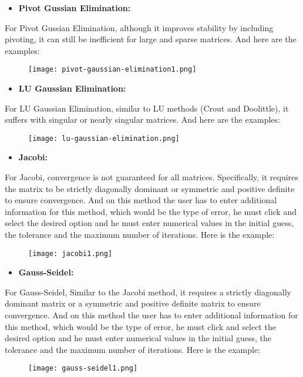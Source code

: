 \documentclass{uofa-eng-assignment}
\begin{document}
\begin{itemize}
    \item \textbf{Pivot Gussian Elimination:}
\end{itemize}
For Pivot Gussian Elimination, although it improves stability by including pivoting, it can still be inefficient for large and sparse matrices. And here are the examples:
\begin{figure}
    \centering
    \texttt{[image: pivot-gaussian-elimination1.png]}
\end{figure}
\begin{itemize}
    \item \textbf{LU Gaussian Elimination:}
\end{itemize}
For LU Gaussian Elimination, similar to LU methods (Crout and Doolittle), it suffers with singular or nearly singular matrices. And here are the examples:
\begin{figure}[H]
    \centering
    \texttt{[image: lu-gaussian-elimination.png]}
\end{figure}
\begin{itemize}
    \item \textbf{Jacobi:}
\end{itemize}
For Jacobi, convergence is not guaranteed for all matrices. Specifically, it requires the matrix to be strictly diagonally dominant or symmetric and positive definite to ensure convergence. And on this method the user has to enter additional information for this method, which would be the type of error, he must click and select the desired option and he must enter numerical values ​​in the initial guess, the tolerance and the maximum number of iterations. Here is the example:
\begin{figure}[H]
    \centering
    \texttt{[image: jacobi1.png]}
\end{figure}
\begin{itemize}
    \item \textbf{Gauss-Seidel:}
\end{itemize}
For Gauss-Seidel, Similar to the Jacobi method, it requires a strictly diagonally dominant matrix or a symmetric and positive definite matrix to ensure convergence. And on this method the user has to enter additional information for this method, which would be the type of error, he must click and select the desired option and he must enter numerical values ​​in the initial guess, the tolerance and the maximum number of iterations. Here is the example:
\begin{figure}[H]
    \centering
    \texttt{[image: gauss-seidel1.png]}
\end{figure}
\end{document}
